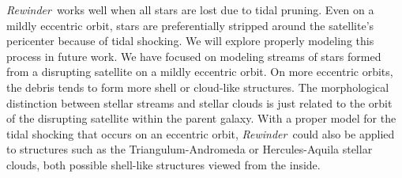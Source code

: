\documentclass[letterpaper,12pt,preprint]{aastex}
\newcommand{\project}[1]{\textsl{#1}}
\newcommand{\gaia}{\project{Gaia}}
\newcommand{\rewinder}{\emph{Rewinder}}
\begin{document}


\rewinder\, works well when all stars are lost due to tidal pruning. Even on a mildly eccentric orbit, stars are preferentially stripped around the satellite's pericenter because of tidal shocking. We will explore properly modeling this process in future work. We have focused on modeling streams of stars formed from a disrupting satellite on a mildly eccentric orbit. On more eccentric orbits, the debris tends to form more shell or cloud-like structures. The morphological distinction between stellar streams and stellar clouds is just related to the orbit of the disrupting satellite within the parent galaxy. With a proper model for the tidal shocking that occurs on an eccentric orbit, \rewinder\ could also be applied to structures such as the Triangulum-Andromeda \citep{rochapinto04} or Hercules-Aquila \citep{belokurov07b} stellar clouds, both possible shell-like structures viewed from the inside. 
\end{document}
